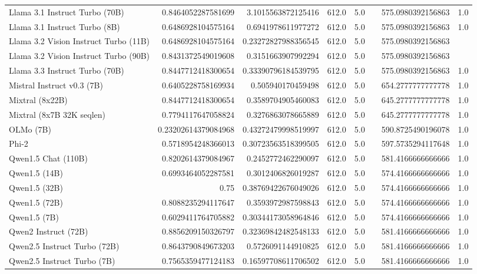 \begin{table}[htp]
{\begin{tabular}{lrrrrrrr}
Llama 3.1 Instruct Turbo (70B) & 0.8464052287581699 & 3.1015563872125416 & 612.0 & 5.0 &  & 575.0980392156863 & 1.0 \\
Llama 3.1 Instruct Turbo (8B) & 0.6486928104575164 & 0.6941978611977272 & 612.0 & 5.0 &  & 575.0980392156863 & 1.0 \\
Llama 3.2 Vision Instruct Turbo (11B) & 0.6486928104575164 & 0.23272827988356545 & 612.0 & 5.0 &  & 575.0980392156863 &  \\
Llama 3.2 Vision Instruct Turbo (90B) & 0.8431372549019608 & 0.3151663907992294 & 612.0 & 5.0 &  & 575.0980392156863 &  \\
Llama 3.3 Instruct Turbo (70B) & 0.8447712418300654 & 0.33390796184539795 & 612.0 & 5.0 &  & 575.0980392156863 & 1.0 \\
Mistral Instruct v0.3 (7B) & 0.6405228758169934 & 0.505940170459498 & 612.0 & 5.0 &  & 654.2777777777778 & 1.0 \\
Mixtral (8x22B) & 0.8447712418300654 & 0.3589704905460083 & 612.0 & 5.0 &  & 645.2777777777778 & 1.0 \\
Mixtral (8x7B 32K seqlen) & 0.7794117647058824 & 0.3276863078665889 & 612.0 & 5.0 &  & 645.2777777777778 & 1.0 \\
OLMo (7B) & 0.23202614379084968 & 0.43272479998519997 & 612.0 & 5.0 &  & 590.8725490196078 & 1.0 \\
Phi-2 & 0.5718954248366013 & 0.30723563518399505 & 612.0 & 5.0 &  & 597.5735294117648 & 1.0 \\
Qwen1.5 Chat (110B) & 0.8202614379084967 & 0.2452772462290097 & 612.0 & 5.0 &  & 581.4166666666666 & 1.0 \\
Qwen1.5 (14B) & 0.6993464052287581 & 0.3012406826019287 & 612.0 & 5.0 &  & 574.4166666666666 & 1.0 \\
Qwen1.5 (32B) & 0.75 & 0.38769422676049026 & 612.0 & 5.0 &  & 574.4166666666666 & 1.0 \\
Qwen1.5 (72B) & 0.8088235294117647 & 0.3593972987598843 & 612.0 & 5.0 &  & 574.4166666666666 & 1.0 \\
Qwen1.5 (7B) & 0.6029411764705882 & 0.30344173058964846 & 612.0 & 5.0 &  & 574.4166666666666 & 1.0 \\
Qwen2 Instruct (72B) & 0.8856209150326797 & 0.32369842482548133 & 612.0 & 5.0 &  & 581.4166666666666 & 1.0 \\
Qwen2.5 Instruct Turbo (72B) & 0.8643790849673203 & 0.5726091144910825 & 612.0 & 5.0 &  & 581.4166666666666 & 1.0 \\
Qwen2.5 Instruct Turbo (7B) & 0.7565359477124183 & 0.16597708611706502 & 612.0 & 5.0 &  & 581.4166666666666 & 1.0 \\

\end{tabular}}
\end{table}
